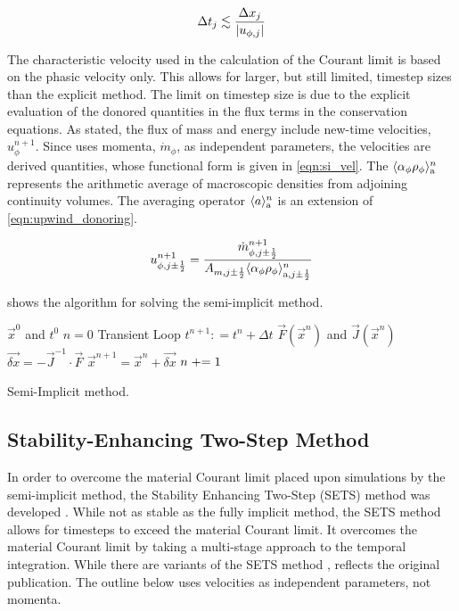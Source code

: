 \begin{equation}
\label{eqn:si_cfl}
\dt{}_j \lesssim \frac{\dx{}_j}{|u_{\phi,j}|}
\end{equation}

The characteristic velocity used in the calculation of the Courant limit is based on the phasic velocity only.
This allows for larger, but still limited, timestep sizes than the explicit method.
The limit on timestep size is due to the explicit evaluation of the donored quantities in the flux terms in the conservation equations.
As stated, the flux of mass and energy include new-time velocities, $u^{n+1}_{\phi}$.
Since \cobra{} uses momenta, $\dot{m}_{\phi}$, as independent parameters, the velocities are derived quantities, whose functional form is given in \eqref{eqn:si_vel}.
The $\ave{\alpha_{\phi} \rho_{\phi}}^{n}_{\text{a}}$ represents the arithmetic average of macroscopic densities from adjoining continuity volumes.
The averaging operator $\ave{a}^{n}_{\text{a}}$ is an extension of \eqref{eqn:upwind_donoring}.

\begin{equation}
\label{eqn:si_vel}
u^{n+1}_{\phi, j \pm \onehalf} = \frac{\dot{m}^{n+1}_{\phi, j \pm \onehalf}}{A_{m, j \pm \onehalf} \ave{\alpha_{\phi} \rho_{\phi}}^{n}_{\text{a}, j \pm \onehalf}} 
\end{equation}

 shows the algorithm for solving the semi-implicit method.

\begin{algo}[ht!]
\setlength{\baselineskip}{0.625\baselineskip}
\begin{algorithmic}[1]
\Require $\vec{x}^{0}$ and $t^{0}$
\Set $n = 0$
\Loop \; Transient Loop
    \Set $t^{n+1} : = t^{n} + \Delta t$
	\Calculate $\vec{F}(\vec{x}^{n})$ and $\vec{J}(\vec{x}^{n})$
	\BlackBox $\vec{\delta x} = - \vec{J}^{-1}\cdot\vec{F}$
	\Calculate $\vec{x}^{n+1} = \vec{x}^{n} + \vec{\delta x}$
	\Set $n \mathrel{+}= 1$
\EndLoop
\end{algorithmic}
\caption{\cobra{} Semi-Implicit method.}
\label{alg:si_legacy}
\end{algo}

\subsection{Stability-Enhancing Two-Step Method} 
\label{subsect:numerics_sets}
In order to overcome the material Courant limit placed upon simulations by the semi-implicit method, the Stability Enhancing Two-Step (SETS) method was developed \cite{Mahaffy1982}.
While not as stable as the fully implicit method, the SETS method allows for timesteps to exceed the material Courant limit.
It overcomes the material Courant limit by taking a multi-stage approach to the temporal integration.
While there are variants of the SETS method \cite{TRACE},  reflects the original publication.
The outline below uses velocities as independent parameters, not momenta.

